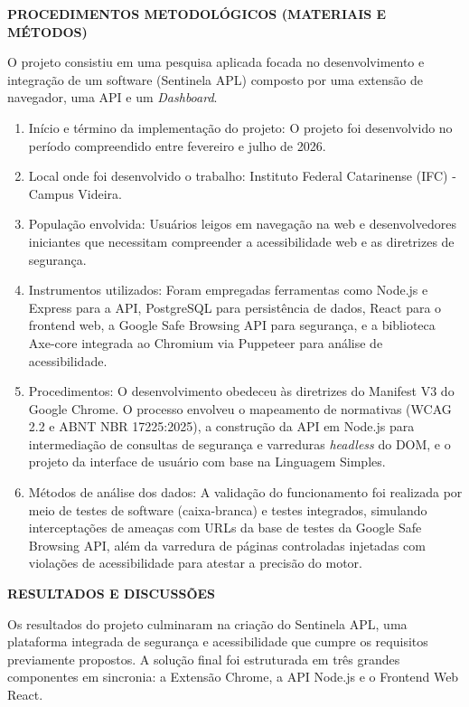 \documentclass[12pt, a4paper]{article}
\newcommand{\titlesection}[1]{
    \vspace{1.5em}
    \noindent\textbf{\MakeUppercase{#1}}
    \vspace{1em}\par
}
\begin{document}
\titlesection{PROCEDIMENTOS METODOLÓGICOS (materiais e métodos)}

O projeto consistiu em uma pesquisa aplicada focada no desenvolvimento e integração de um software (Sentinela APL) composto por uma extensão de navegador, uma API e um \textit{Dashboard}.

\begin{enumerate}[label=\alph*)]
    \item Início e término da implementação do projeto: O projeto foi desenvolvido no período compreendido entre fevereiro e julho de 2026.
    \item Local onde foi desenvolvido o trabalho: Instituto Federal Catarinense (IFC) - Campus Videira.
    \item População envolvida: Usuários leigos em navegação na web e desenvolvedores iniciantes que necessitam compreender a acessibilidade web e as diretrizes de segurança.
    \item Instrumentos utilizados: Foram empregadas ferramentas como Node.js e Express para a API, PostgreSQL para persistência de dados, React para o frontend web, a Google Safe Browsing API para segurança, e a biblioteca Axe-core integrada ao Chromium via Puppeteer para análise de acessibilidade.
    \item Procedimentos: O desenvolvimento obedeceu às diretrizes do Manifest V3 do Google Chrome. O processo envolveu o mapeamento de normativas (WCAG 2.2 e ABNT NBR 17225:2025), a construção da API em Node.js para intermediação de consultas de segurança e varreduras \textit{headless} do DOM, e o projeto da interface de usuário com base na Linguagem Simples.
    \item Métodos de análise dos dados: A validação do funcionamento foi realizada por meio de testes de software (caixa-branca) e testes integrados, simulando interceptações de ameaças com URLs da base de testes da Google Safe Browsing API, além da varredura de páginas controladas injetadas com violações de acessibilidade para atestar a precisão do motor.
\end{enumerate}

\titlesection{RESULTADOS E DISCUSSÕES}

Os resultados do projeto culminaram na criação do Sentinela APL, uma plataforma integrada de segurança e acessibilidade que cumpre os requisitos previamente propostos. A solução final foi estruturada em três grandes componentes em sincronia: a Extensão Chrome, a API Node.js e o Frontend Web React.
\end{document}
